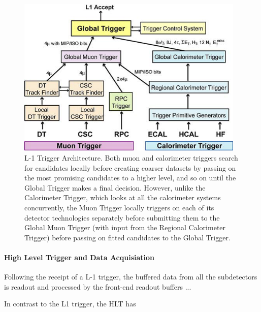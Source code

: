 \begin{figure}[htbp]
\begin{center}
\includegraphics[width=0.97\textwidth]{figs/cms/trigger.png}
\caption{L-1 Trigger Architecture. Both muon and calorimeter triggers search for candidates locally before creating coarser datasets by passing on the most promising candidates to a higher level, and so on until the Global Trigger makes a final decision. However, unlike the Calorimeter Trigger, which looks at all the calorimeter systems concurrently, the Muon Trigger locally triggers on each of its detector technologies separately before submitting them to the Global Muon Trigger (with input from the Regional Calorimeter Trigger) before passing on fitted candidates to the Global Trigger.}
\label{fig:trigger}
\end{center}
\end{figure}

\paragraph{High Level Trigger and Data Acquisiation}\label{paragraph:HLT}
Following the receipt of a L-1 trigger, the buffered data from all the subdetectors is readout and processed by the front-end readout buffers ...

In contrast to the L1 trigger, the HLT has 